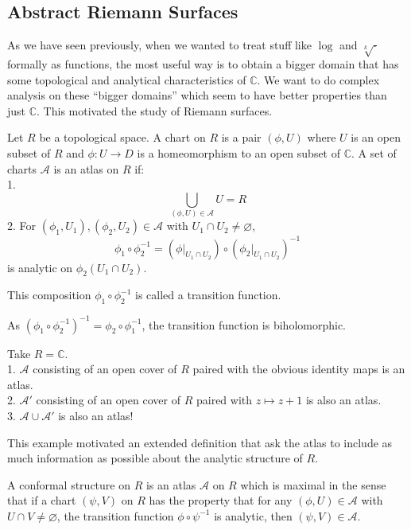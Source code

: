 \subsection{Abstract Riemann Surfaces}
As we have seen previously, when we wanted to treat stuff like $\log$ and $\sqrt[k]{\cdot}$ formally as functions, the most useful way is to obtain a bigger domain that has some topological and analytical characteristics of $\mathbb C$.
We want to do complex analysis on these ``bigger domains'' which seem to have better properties than just $\mathbb C$.
This motivated the study of Riemann surfaces.
\begin{definition}
    Let $R$ be a topological space.
    A chart on $R$ is a pair $(\phi,U)$ where $U$ is an open subset of $R$ and $\phi:U\to D$ is a homeomorphism to an open subset of $\mathbb C$.
    A set of charts $\mathcal A$ is an atlas on $R$ if:\\
    1.
    $$\bigcup_{(\phi,U)\in\mathcal A}U=R$$
    2. For $(\phi_1,U_1),(\phi_2,U_2)\in\mathcal A$ with $U_1\cap U_2\neq\varnothing$,
    $$\phi_1\circ\phi_2^{-1}=(\phi|_{U_1\cap U_2})\circ (\phi_2|_{U_1\cap U_2})^{-1}$$
    is analytic on $\phi_2(U_1\cap U_2)$.
\end{definition}
This composition $\phi_1\circ\phi_2^{-1}$ is called a transition function.
\begin{remark}
    As $(\phi_1\circ\phi_2^{-1})^{-1}=\phi_2\circ\phi_1^{-1}$, the transition function is biholomorphic.
\end{remark}
\begin{example}
    Take $R=\mathbb C$.\\
    1. $\mathcal A$ consisting of an open cover of $R$ paired with the obvious identity maps is an atlas.\\
    2. $\mathcal A'$ consisting of an open cover of $R$ paired with $z\mapsto z+1$ is also an atlas.\\
    3. $\mathcal A\cup\mathcal A'$ is also an atlas!
\end{example}
This example motivated an extended definition that ask the atlas to include as much information as possible about the analytic structure of $R$.
\begin{definition}
    A conformal structure on $R$ is an atlas $\mathcal A$ on $R$ which is maximal in the sense that if a chart $(\psi,V)$ on $R$ has the property that for any $(\phi,U)\in\mathcal A$ with $U\cap V\neq\varnothing$, the transition function $\phi\circ\psi^{-1}$ is analytic, then $(\psi,V)\in\mathcal A$.
\end{definition}
